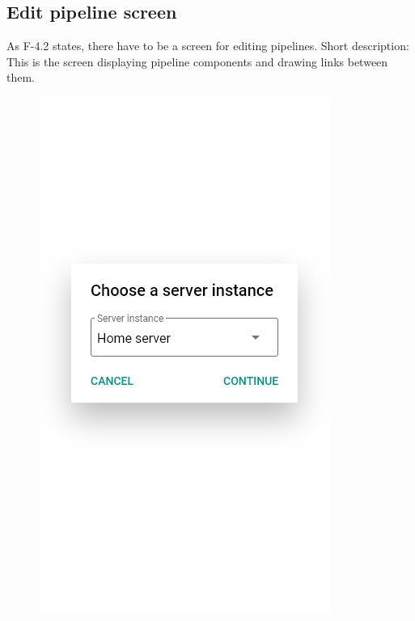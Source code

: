 \subsection{Edit pipeline screen}
As F-4.2 states, there have to be a screen for editing pipelines.
Short description: This is the screen displaying pipeline components and drawing links between them.

\begin{figure}\centering
    \begin{minipage}[b]{0.32\textwidth}
    	\includegraphics[width=\textwidth]{pics/xd/Create new pipeline.png}

\end{minipage}
\end{figure}
